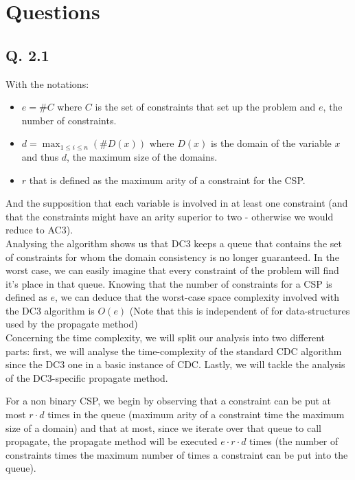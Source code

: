\documentclass[a4paper ,12pt,french]{article}
\begin{document}
\tableofcontents %

\thispagestyle{fancy}

\pagebreak
\setcounter{page}{1}
\pagestyle{fancy} %

\section{Questions}
\subsection{Q. 2.1}
With the notations: \begin{itemize}
\item $e = \#C$ where $C$ is the set of constraints that set up the problem and $e$, the number of constraints.
\item $d = \max_{1\leq i \leq n}(\#D(x))$ where $D(x)$ is the domain of the variable $x$ and thus $d$, the maximum size of the domains. 
\item $r$ that is defined as the maximum arity of a constraint for the CSP.
\end{itemize}
And the supposition that each variable is involved in at least one constraint (and that the constraints might have an arity superior to two - otherwise we would reduce to AC3).\\

Analysing the algorithm shows us that DC3 keeps a queue that contains the set of constraints for whom the domain consistency is no longer guaranteed. In the worst case, we can easily imagine that every constraint of the problem will find it's place in that queue. Knowing that the number of constraints for a CSP is defined as $e$, we can deduce that the worst-case space complexity involved with the DC3 algorithm is $O(e)$ (Note that this is independent of for data-structures used by the propagate method)\\

Concerning the time complexity, we will split our analysis into two different parts: first, we will analyse the time-complexity of the standard CDC algorithm since the DC3 one in a basic instance of CDC. Lastly, we will tackle the analysis of the DC3-specific propagate method.

For a non binary CSP, we begin by observing that a constraint can be put at most $r\cdot d$ times in the queue (maximum arity of a constraint time the maximum size of a domain) and that at most, since we iterate over that queue to call propagate, the propagate method will be executed $e\cdot r\cdot d$ times (the number of constraints times the maximum number of times a constraint can be put into the queue). 
\end{document}
